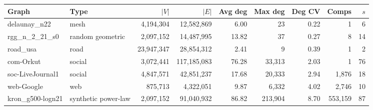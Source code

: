 \begin{tabular}{llrrrrrrr}
\hline
Graph & Type & $|V|$ & $|E|$ & Avg deg & Max deg & Deg CV & Comps & $s$ \\
\hline
delaunay\_n22 & mesh & 4,194,304 & 12,582,869 & 6.00 & 23 & 0.22 & 1 & 6 \\
rgg\_n\_2\_21\_s0 & random geometric & 2,097,152 & 14,487,995 & 13.82 & 37 & 0.27 & 8 & 14 \\
road\_usa & road & 23,947,347 & 28,854,312 & 2.41 & 9 & 0.39 & 1 & 2 \\
com-Orkut & social & 3,072,441 & 117,185,083 & 76.28 & 33,313 & 2.03 & 1 & 76 \\
soc-LiveJournal1 & social & 4,847,571 & 42,851,237 & 17.68 & 20,333 & 2.94 & 1,876 & 18 \\
web-Google & web & 875,713 & 4,322,051 & 9.87 & 6,332 & 4.02 & 2,746 & 10 \\
kron\_g500-logn21 & synthetic power-law & 2,097,152 & 91,040,932 & 86.82 & 213,904 & 8.70 & 553,159 & 87 \\
\hline
\end{tabular}
